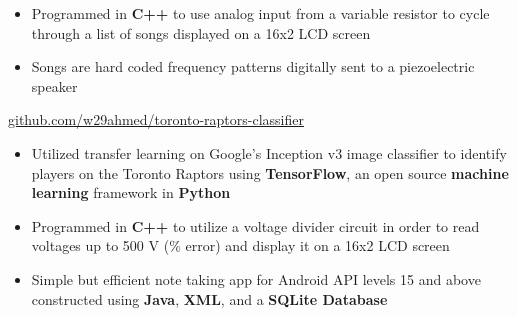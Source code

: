 

\begin{itemize}
\item Programmed in \textbf{C++} to use analog input from a variable resistor to cycle through a list of songs displayed on a 16x2 LCD screen
\item Songs are hard coded frequency patterns digitally sent to a piezoelectric speaker
\end{itemize}

\divider

{\href{https://github.com/w29ahmed/toronto-raptors-classifier}{github.com/w29ahmed/toronto-raptors-classifier}}
\begin{itemize}
\item Utilized transfer learning on Google's Inception v3 image classifier to identify players on the Toronto Raptors using \textbf{TensorFlow}, an open source \textbf{machine learning} framework in \textbf{Python}
\end{itemize}

\divider

\begin{itemize}
\item Programmed in \textbf{C++} to utilize a voltage divider circuit in order to read voltages up to 500 V (\% error) and display it on a 16x2 LCD screen
\end{itemize}

\divider

\begin{itemize}
\item Simple but efficient note taking app for Android API levels 15 and above constructed using \textbf{Java}, \textbf{XML}, and a \textbf{SQLite Database }
\end{itemize}



